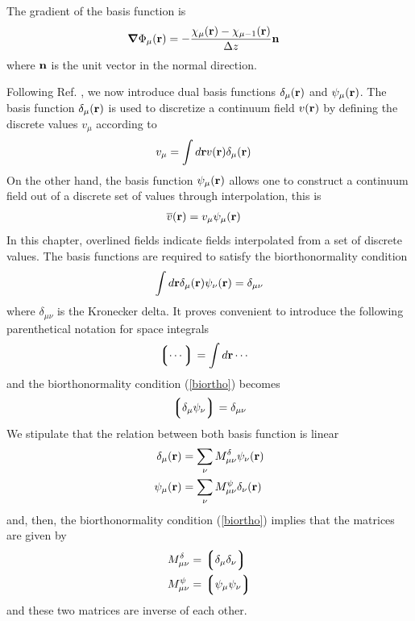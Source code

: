 \documentclass[b5paper,openright,11pt]{book}
\newcommand{\llg}{\left\lgroup}
\newcommand{\rlg}{\right\rgroup}
\begin{document}
The gradient of the basis function is
\begin{align}
\boldsymbol{\nabla}\Phi_\mu({\bf r})&=-\frac{\chi_\mu({\bf r})-\chi_{\mu-1}({\bf r})}{\Delta z}{\bf n}
\label{partialpsi}
\end{align}
where ${\bf n}$ is the unit vector in the normal direction.

Following  Ref. \cite{EspanolDonev2015},  we  now introduce  dual basis  functions
$\delta_\mu({\bf  r})$ and  $\psi_\mu({\bf r})$.   The basis  function
$\delta_\mu({\bf r})$ is used to  discretize a continuum field $v({\bf
  r})$ by defining the discrete values $v_\mu$ according to
\begin{align}
  v_\mu&=\int d{\bf r}v({\bf r})\delta_\mu({\bf r})
\label{Disc}
\end{align}
On the other hand,  the  basis function  $\psi_\mu({\bf r})$ allows one
to construct a continuum field out of a discrete set of values through
interpolation, this is
\begin{align}
  \overline{v}({\bf r}) &=v_\mu\psi_\mu({\bf r})
\label{Cont}
\end{align}
In this chapter, overlined fields indicate  fields interpolated from
a set of discrete values. 
The basis functions are required to
satisfy the biorthonormality condition
\begin{align}
  \int d{\bf r}\delta_\mu({\bf r})\psi_\nu({\bf r})=\delta_{\mu\nu}
\label{biortho}
\end{align}
where $\delta_{\mu\nu}$ is the Kronecker delta. 
It proves convenient to introduce the following 
parenthetical notation for space integrals
\begin{align}
  \llg \cdots\rlg &=\int d{\bf r}\cdots
\label{notation}
\end{align}
and the biorthonormality condition (\ref{biortho}) becomes
\begin{align}
\llg\delta_\mu\psi_\nu\rlg=\delta_{\mu\nu}
\label{biortho2}
\end{align}
We stipulate that the relation between both basis function is linear
\begin{align}
  \delta_\mu({\bf r})&=\sum_\nu M^\delta_{\mu\nu}\psi_\nu({\bf r})
\nonumber\\
  \psi_\mu({\bf r})&=\sum_\nu M^\psi_{\mu\nu}\delta_\nu({\bf r})
\label{dual}
\end{align}
and, then, the biorthonormality condition (\ref{biortho}) implies that 
the matrices are given by
\begin{align}
  M^\delta_{\mu\nu}&= \llg\delta_\mu\delta_\nu\rlg
\nonumber\\
  M^\psi_{\mu\nu}&= \llg\psi_\mu\psi_\nu\rlg
\label{MM}
\end{align}
and these two matrices are inverse of each other.
\end{document}
